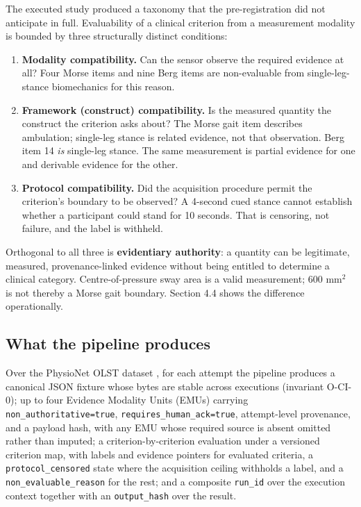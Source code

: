 \documentclass[11pt]{article}
\providecommand{\tightlist}{\setlength{\itemsep}{0pt}\setlength{\parskip}{0pt}}
\begin{document}
The executed study produced a taxonomy that the pre-registration did not anticipate in full. Evaluability of a clinical criterion from a measurement modality is bounded by three structurally distinct conditions:

\begin{enumerate}
\def\labelenumi{\arabic{enumi}.}
\tightlist
\item
  \textbf{Modality compatibility.} Can the sensor observe the required evidence at all? Four Morse items and nine Berg items are non-evaluable from single-leg-stance biomechanics for this reason.
\item
  \textbf{Framework (construct) compatibility.} Is the measured quantity the construct the criterion asks about? The Morse gait item describes ambulation; single-leg stance is related evidence, not that observation. Berg item 14 \emph{is} single-leg stance. The same measurement is partial evidence for one and derivable evidence for the other.
\item
  \textbf{Protocol compatibility.} Did the acquisition procedure permit the criterion's boundary to be observed? A 4-second cued stance cannot establish whether a participant could stand for 10 seconds. That is censoring, not failure, and the label is withheld.
\end{enumerate}

Orthogonal to all three is \textbf{evidentiary authority}: a quantity can be legitimate, measured, provenance-linked evidence without being entitled to determine a clinical category. Centre-of-pressure sway area is a valid measurement; 600 mm$^{2}$ is not thereby a Morse gait boundary. Section 4.4 shows the difference operationally.

\subsection{What the pipeline produces}\label{what-the-pipeline-produces}

Over the PhysioNet OLST dataset \citep{copeland2026scidata}, for each attempt the pipeline produces a canonical JSON fixture whose bytes are stable across executions (invariant O-CI-0); up to four Evidence Modality Units (EMUs) carrying \texttt{non\_authoritative=true}, \texttt{requires\_human\_ack=true}, attempt-level provenance, and a payload hash, with any EMU whose required source is absent omitted rather than imputed; a criterion-by-criterion evaluation under a versioned criterion map, with labels and evidence pointers for evaluated criteria, a \texttt{protocol\_censored} state where the acquisition ceiling withholds a label, and a \texttt{non\_evaluable\_reason} for the rest; and a composite \texttt{run\_id} over the execution context together with an \texttt{output\_hash} over the result.
\end{document}
